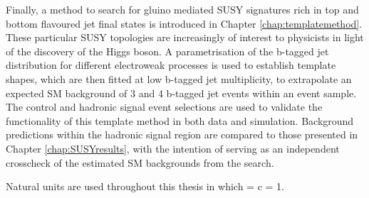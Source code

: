 Finally, a method to search for gluino mediated \ac{SUSY} signatures rich in top and bottom flavoured jet final states is introduced in Chapter \ref{chap:templatemethod}. These particular \ac{SUSY} topologies are increasingly of interest to physicists in light of the discovery of the Higgs boson. A parametrisation of the b-tagged jet distribution for different electroweak processes is used to establish template shapes, which are then fitted at low b-tagged jet multiplicity,  to extrapolate an expected \ac{SM} background of 3 and 4 b-tagged jet events within an event sample. The \alphat control and hadronic signal event selections are used to validate the functionality of this template method in both data and simulation. Background predictions within the hadronic signal region are compared to those presented in Chapter \ref{chap:SUSYresults}, with the intention of serving as an independent crosscheck of the estimated \ac{SM} backgrounds from the \alphat search. 

Natural units are used throughout this thesis in which \hbarred = c = 1.
